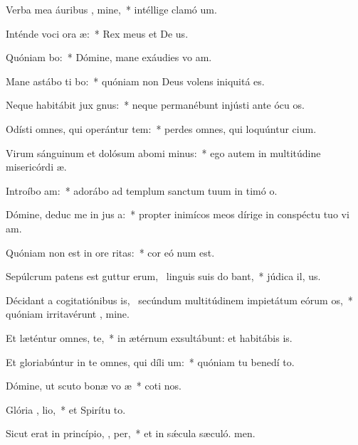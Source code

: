 \item Verba mea áuribus , mine,~* intéllige clamó um.
\item Inténde voci ora æ:~* Rex meus et De us.
\item Quóniam   bo:~* Dómine, mane exáudies vo am.
\item Mane astábo ti  bo:~* quóniam non Deus volens iniquitá  es.
\item Neque habitábit jux  gnus:~* neque permanébunt injústi ante ócu os.
\item Odísti omnes, qui operántur tem:~* perdes omnes, qui loquúntur cium.
\item Virum sánguinum et dolósum abomi minus:~* ego autem in multitúdine misericórdi æ.
\item Introíbo   am:~* adorábo ad templum sanctum tuum in timó o.
\item Dómine, deduc me in jus a:~* propter inimícos meos dírige in conspéctu tuo vi am.
\item Quóniam non est in ore  ritas:~* cor eó num est.
\item Sepúlcrum patens est guttur erum,~\pscross{} linguis suis do bant,~* júdica il, us.
\item Décidant a cogitatiónibus is,~\pscross{} secúndum multitúdinem impietátum eórum  os,~* quóniam irritavérunt , mine.
\item Et læténtur omnes,    te,~* in ætérnum exsultábunt: et habitábis  is.
\item Et gloriabúntur in te omnes, qui díli  um:~* quóniam tu benedí to.
\item Dómine, ut scuto bonæ vo æ~* coti nos.
\item Glória ,  lio,~* et Spirítu to.
\item Sicut erat in princípio,  ,  per,~* et in sǽcula sæculó. men.
